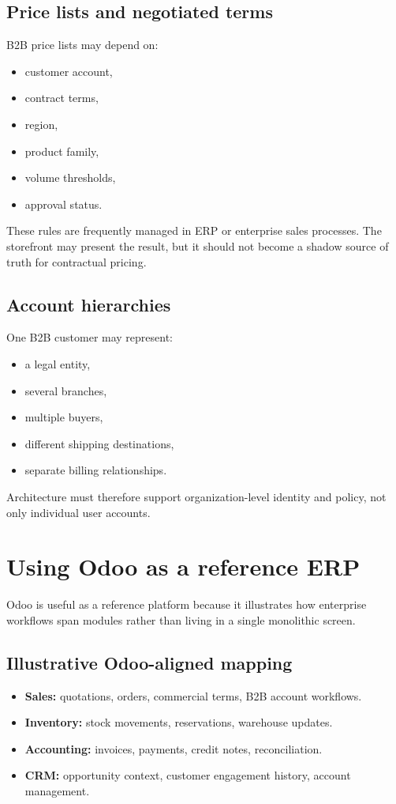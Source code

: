 \subsection{Price lists and negotiated terms}
B2B price lists may depend on:
\begin{itemize}
  \item customer account,
  \item contract terms,
  \item region,
  \item product family,
  \item volume thresholds,
  \item approval status.
\end{itemize}

These rules are frequently managed in ERP or enterprise sales processes.
The storefront may present the result, but it should not become a shadow source of truth for contractual pricing.

\subsection{Account hierarchies}
One B2B customer may represent:
\begin{itemize}
  \item a legal entity,
  \item several branches,
  \item multiple buyers,
  \item different shipping destinations,
  \item separate billing relationships.
\end{itemize}

Architecture must therefore support organization-level identity and policy, not only individual user accounts.

\section{Using Odoo as a reference ERP}
Odoo is useful as a reference platform because it illustrates how enterprise workflows span modules rather than living in a single monolithic screen.

\subsection{Illustrative Odoo-aligned mapping}
\begin{itemize}
  \item \textbf{Sales:} quotations, orders, commercial terms, B2B account workflows.
  \item \textbf{Inventory:} stock movements, reservations, warehouse updates.
  \item \textbf{Accounting:} invoices, payments, credit notes, reconciliation.
  \item \textbf{CRM:} opportunity context, customer engagement history, account management.
\end{itemize}

